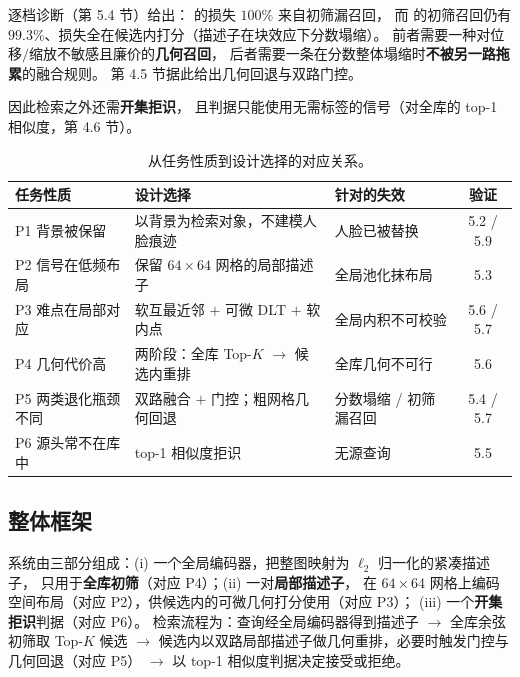 逐档诊断（第 5.4 节）给出：
 的损失 $100\%$ 来自初筛漏召回，
而  的初筛召回仍有 $99.3\%$、损失全在候选内打分（描述子在块效应下分数塌缩）。
前者需要一种对位移$/$缩放不敏感且廉价的\textbf{几何召回}，
后者需要一条在分数整体塌缩时\textbf{不被另一路拖累}的融合规则。
第 4.5 节据此给出几何回退与双路门控。

因此检索之外还需\textbf{开集拒识}，
且判据只能使用无需标签的信号（对全库的 top-1 相似度，第 4.6 节）。

\begin{table}[t]
\centering
\caption{从任务性质到设计选择的对应关系。}
\label{tab:design}
\small
\begin{tabular}{p{3.2cm}p{4.6cm}p{3.2cm}c}
\toprule
任务性质 & 设计选择 & 针对的失效 & 验证 \\
\midrule
P1 背景被保留      & 以背景为检索对象，不建模人脸痕迹     & 人脸已被替换   & 5.2 / 5.9 \\
P2 信号在低频布局  & 保留 $64\times64$ 网格的局部描述子   & 全局池化抹布局 & 5.3 \\
P3 难点在局部对应  & 软互最近邻 $+$ 可微 DLT $+$ 软内点   & 全局内积不可校验 & 5.6 / 5.7 \\
P4 几何代价高      & 两阶段：全库 Top-$K$ $\rightarrow$ 候选内重排 & 全库几何不可行 & 5.6 \\
P5 两类退化瓶颈不同 & 双路融合 $+$ 门控；粗网格几何回退 & 分数塌缩 / 初筛漏召回 & 5.4 / 5.7 \\
P6 源头常不在库中  & top-1 相似度拒识                    & 无源查询       & 5.5 \\
\bottomrule
\end{tabular}
\end{table}

\subsection{整体框架}

系统由三部分组成：(i) 一个全局编码器，把整图映射为 $\ell_2$ 归一化的紧凑描述子，
只用于\textbf{全库初筛}（对应 P4）；(ii) 一对\textbf{局部描述子}，
在 $64\times64$ 网格上编码空间布局（对应 P2），供候选内的可微几何打分使用（对应 P3）；
(iii) 一个\textbf{开集拒识}判据（对应 P6）。
检索流程为：查询经全局编码器得到描述子 $\rightarrow$ 全库余弦初筛取 Top-$K$ 候选
$\rightarrow$ 候选内以双路局部描述子做几何重排，必要时触发门控与几何回退（对应 P5）
$\rightarrow$ 以 top-1 相似度判据决定接受或拒绝。

